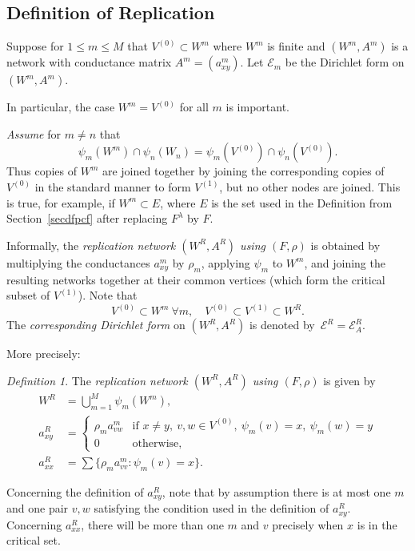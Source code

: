 \documentclass[a4paper]{amsart}
\theoremstyle{plain}
\theoremstyle{definition}
\theoremstyle{remark}
\newtheorem{defn}[theorem]{Definition}
\begin{document}
\subsection{Definition of Replication}  \label{secdfr} Suppose  for $ 1 \leq m \leq M $ that $ V^{(0)} \subset W^m $ where $ W^m $ is finite  and $ (W^m,A^m) $ is a network with conductance matrix $ A^m = (a^m_{xy}) $. Let $ \mathcal{E}_m $ be the  Dirichlet form on $ (W^m,A^m) $.


 In particular, the case $ W^m= V^{(0)} $ for all $ m $ is important.  
 
\medskip
 \emph{Assume} for $ m \neq n $ that 
\begin{equation} \label{wint}
 \psi  _m (W^m) \cap \psi  _n (W_n) =  \psi  _m (V^{(0)}) \cap \psi  _n (V^{(0)}) .
\end{equation} 
Thus copies of   $ W^m $ are   joined together by joining   the corresponding copies  of $ V^{(0)} $ in the standard manner  to form $ V^{(1)} $, but no other nodes are joined.
This is true, for example,  if $ W^m\subset E$, where $ E $ is the set used in the Definition from  Section~\ref{secdfpcf} after replacing $ F^ \lambda $ by $ F $.
  
\medskip   Informally, the  \emph{replication network  $(W^R , A^ R ) $       using $ (F,\rho ) $} is obtained by
multiplying the conductances   $ a^m_{xy} $ by $ \rho_m   $, applying    $ \psi   _m $ to   $ W^m $, and joining the resulting networks together at their common vertices (which form the critical subset of $ V^{(1)}$).
Note that 
\begin{equation} \label{} 
V^{(0)} \subset W^m\ \forall m , \quad V^{(0)} \subset V^{(1)}\subset W^R.
\end{equation} 
The \emph{corresponding Dirichlet form} on $ (W^R,A^R) $ is denoted by~$ \mathcal{E} ^R = \mathcal{E} _A^R$.

 \medskip More precisely:
\begin{defn}  The  \emph{replication network  $(W^R , A^ R ) $       using $ (F,\rho ) $} is given  by
\begin{equation} \label{dfrn}
\begin{aligned}
W^R  &  = \bigcup_{m=1}^{M } \psi  _ m (W^m),\\
 a_{xy} ^R  &= 
 \begin{cases}
       \rho _m a^m_{vw} & 
       \text{if }  x\neq y,\ v,w\in V^{(0)}, \  \psi  _ m(v) = x,\   \psi _ m(w) = y \\
            0                                    & \text{otherwise},
            \end{cases} \\
  a_{xx}^R  &= \sum\{\rho   _m a^m_{vv} :  \psi  _ m(v) = x  \}.
  \end{aligned}
  \end{equation} 
  \end{defn} 
Concerning the definition of $ a_{xy}^R $, note that by assumption there is at most one  $ m $ and one pair $ {v,w} $ satisfying the condition used in the  definition of $ a_{xy}^R  $.   Concerning $ a^R_{xx} $, there will be more than one  $ m $ and $ v $ precisely when $ x $ is in the critical set.
  
\end{document}
